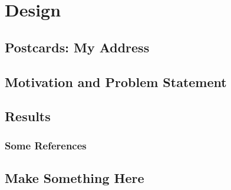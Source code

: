 %
\chapter{Design}
\label{sec:design}


\section{Postcards: My Address}
\label{sec:design:address}


\section{Motivation and Problem Statement}
\label{sec:design:motivation}


\section{Results}
\label{sec:design:results}


\subsection{Some References}
\label{sec:design:results:refs}

\section{Make Something Here}
\label{sec:design:CHANGEME}
